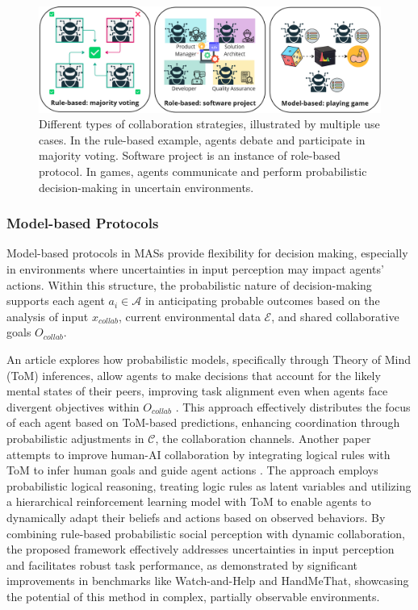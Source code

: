 \documentclass[acmsmall,nonacm]{acmart}
\begin{document}
        \begin{figure}[!t]
            \centering
            \includegraphics[width=0.95\linewidth]{image-lib/collab_strategies.png}
            \caption{Different types of collaboration strategies, illustrated by multiple use cases. In the rule-based example, agents debate and participate in majority voting. Software project is an instance of role-based protocol. In games, agents communicate and perform probabilistic decision-making in uncertain environments.}
            \label{fig:collab-strategies}
            \Description{}
        \end{figure}

        \subsubsection{Model-based Protocols}
        Model-based protocols in MASs provide flexibility for decision making, especially in environments where uncertainties in input perception may impact agents' actions. Within this structure, the probabilistic nature of decision-making supports each agent $a_i \in \mathcal{A}$ in anticipating probable outcomes based on the analysis of input $x_{collab}$, current environmental data $\mathcal{E}$, and shared collaborative goals $O_{collab}$. 
        
        An article explores how probabilistic models, specifically through Theory of Mind (ToM) inferences, allow agents to make decisions that account for the likely mental states of their peers, improving task alignment even when agents face divergent objectives within $O_{collab}$ \cite{li-etal-2023-theory}. This approach effectively distributes the focus of each agent based on ToM-based predictions, enhancing coordination through probabilistic adjustments in $\mathcal{C}$, the collaboration channels. Another paper attempts to improve human-AI collaboration by integrating logical rules with ToM to infer human goals and guide agent actions \cite{cao2024enhancing}. The approach employs probabilistic logical reasoning, treating logic rules as latent variables and utilizing a hierarchical reinforcement learning model with ToM to enable agents to dynamically adapt their beliefs and actions based on observed behaviors. By combining rule-based probabilistic social perception with dynamic collaboration, the proposed framework effectively addresses uncertainties in input perception and facilitates robust task performance, as demonstrated by significant improvements in benchmarks like Watch-and-Help and HandMeThat, showcasing the potential of this method in complex, partially observable environments.
        
\end{document}
